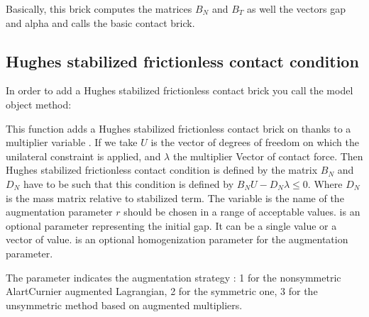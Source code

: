 \documentclass[a4paper,11pt,english]{sphinxmanual}
\begin{document}
Basically, this brick computes the matrices \(B_N\) and \(B_T\)
as well the vectors gap and alpha and calls the basic contact brick.


\subsection{Hughes stabilized frictionless contact condition}
\label{\detokenize{userdoc/model_contact_friction:hughes-stabilized-frictionless-contact-condition}}
In order to add a Hughes stabilized frictionless contact brick you call the model object method:

\begin{sphinxVerbatim}[commandchars=\\\{\}]
            
\end{sphinxVerbatim}

This function adds a Hughes stabilized frictionless contact brick on  thanks to a multiplier variable . If we take \(U\) is the vector of degrees of freedom on which the unilateral constraint is applied, and \(\lambda\) the multiplier Vector of contact force. Then Hughes stabilized frictionless contact condition is defined by the matrix \(B_N\) and \(D_N\) have to be such that this condition is defined by \(B_N U - D_N \lambda \le 0\). Where \(D_N\) is the mass matrix relative to stabilized term. The variable  is the name of the augmentation parameter \(r\) should be chosen in a range of acceptable values.  is an optional parameter representing the initial gap. It can be a single value or a vector of value.  is an optional homogenization parameter for the augmentation parameter.

The parameter  indicates the augmentation strategy :  1 for the non\sphinxhyphen{}symmetric Alart\sphinxhyphen{}Curnier augmented Lagrangian, 2 for the symmetric one, 3 for the unsymmetric method based on augmented multipliers.
\end{document}
